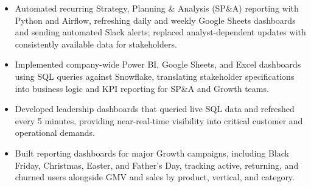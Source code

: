

\begin{itemize}
  \item Automated recurring Strategy, Planning \& Analysis (SP\&A) reporting with Python and Airflow, refreshing daily and weekly Google Sheets dashboards and sending automated Slack alerts; replaced analyst-dependent updates with consistently available data for stakeholders.
  \item Implemented company-wide Power BI, Google Sheets, and Excel dashboards using SQL queries against Snowflake, translating stakeholder specifications into business logic and KPI reporting for SP\&A and Growth teams.
  \item Developed leadership dashboards that queried live SQL data and refreshed every 5 minutes, providing near-real-time visibility into critical customer and operational demands.
  \item Built reporting dashboards for major Growth campaigns, including Black Friday, Christmas, Easter, and Father's Day, tracking active, returning, and churned users alongside GMV and sales by product, vertical, and category.
\end{itemize}


\vspace{-1.5em} %